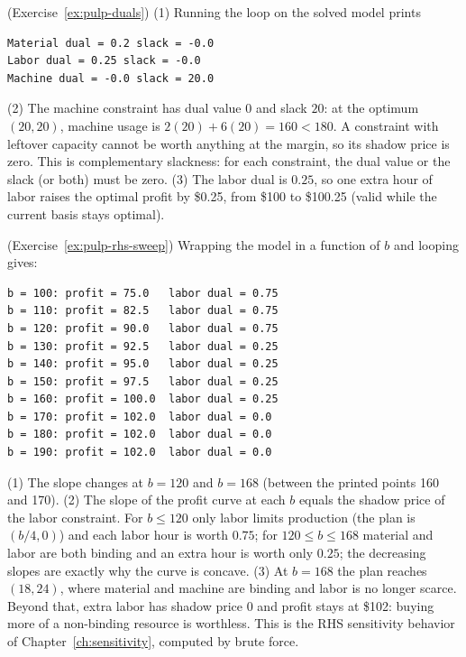 \begin{solution}(Exercise~\ref{ex:pulp-duals})
(1) Running the loop on the solved model prints
\begin{verbatim}
Material dual = 0.2 slack = -0.0
Labor dual = 0.25 slack = -0.0
Machine dual = -0.0 slack = 20.0
\end{verbatim}
(2) The machine constraint has dual value $0$ and slack $20$: at the optimum $(20,20)$, machine usage is $2(20) + 6(20) = 160 < 180$. A constraint with leftover capacity cannot be worth anything at the margin, so its shadow price is zero. This is complementary slackness: for each constraint, the dual value or the slack (or both) must be zero.
(3) The labor dual is $0.25$, so one extra hour of labor raises the optimal profit by \$0.25, from \$100 to \$100.25 (valid while the current basis stays optimal).
\end{solution}

\begin{solution}(Exercise~\ref{ex:pulp-rhs-sweep})
Wrapping the model in a function of $b$ and looping gives:
\begin{verbatim}
b = 100: profit = 75.0   labor dual = 0.75
b = 110: profit = 82.5   labor dual = 0.75
b = 120: profit = 90.0   labor dual = 0.75
b = 130: profit = 92.5   labor dual = 0.25
b = 140: profit = 95.0   labor dual = 0.25
b = 150: profit = 97.5   labor dual = 0.25
b = 160: profit = 100.0  labor dual = 0.25
b = 170: profit = 102.0  labor dual = 0.0
b = 180: profit = 102.0  labor dual = 0.0
b = 190: profit = 102.0  labor dual = 0.0
\end{verbatim}
(1) The slope changes at $b = 120$ and $b = 168$ (between the printed points 160 and 170).
(2) The slope of the profit curve at each $b$ equals the shadow price of the labor constraint. For $b \leq 120$ only labor limits production (the plan is $(b/4, 0)$) and each labor hour is worth $0.75$; for $120 \leq b \leq 168$ material and labor are both binding and an extra hour is worth only $0.25$; the decreasing slopes are exactly why the curve is concave.
(3) At $b = 168$ the plan reaches $(18, 24)$, where material and machine are binding and labor is no longer scarce. Beyond that, extra labor has shadow price $0$ and profit stays at \$102: buying more of a non-binding resource is worthless. This is the RHS sensitivity behavior of Chapter~\ref{ch:sensitivity}, computed by brute force.
\end{solution}
